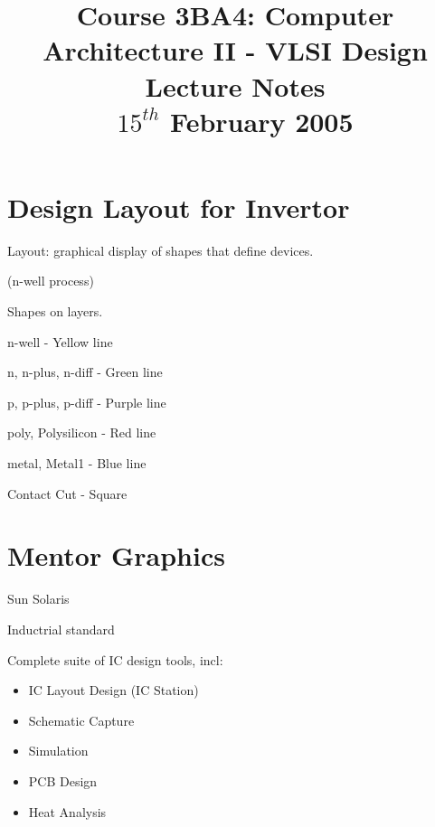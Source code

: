 \documentclass[a4paper,12pt]{article}
\begin{document}
\title{Course 3BA4: Computer Architecture II - VLSI Design \\ Lecture Notes \\ $15^{th}$ February 2005}

\maketitle

\section*{Design Layout for Invertor}

\begin{table}[h]


\end{table}

Layout: graphical display of shapes that define devices.


(n-well process)


Shapes on layers.


n-well - Yellow line

n, n-plus, n-diff - Green line

p, p-plus, p-diff - Purple line

poly, Polysilicon - Red line

metal, Metal1 - Blue line

Contact Cut - Square

\begin{table}[h]


\end{table}

\section*{Mentor Graphics}

Sun Solaris

Inductrial standard

Complete suite of IC design tools, incl:

\begin{itemize}

\item IC Layout Design (IC Station)

\item Schematic Capture

\item Simulation

\item PCB Design

\item Heat Analysis

\end{itemize}
\end{document}
